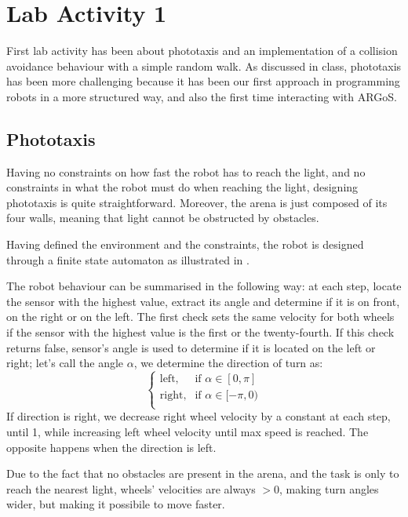 \section{Lab Activity 1}\label{sec:lab01}

First lab activity has been about phototaxis and an implementation of a
collision avoidance behaviour with a simple random walk.
As discussed in class, phototaxis has been more challenging because
it has been our first approach in programming robots in a more structured
way, and also the first time interacting with ARGoS.

\subsection{Phototaxis}\label{ssec:phototaxis}

Having no constraints on how fast the robot has to reach the light, and
no constraints in what the robot must do when reaching the light, designing
phototaxis is quite straightforward. Moreover, the arena is just composed
of its four walls, meaning that light cannot be obstructed by obstacles.

Having defined the environment and the constraints, the robot is designed through
a finite state automaton as illustrated in .

The robot behaviour can be summarised in the following way: at each step,
locate the sensor with the highest value, extract its angle and determine if it
is on front, on the right or on the left. The first check sets the same
velocity for both wheels if the sensor with the highest value is the first or
the twenty-fourth. If this check returns false, sensor's angle is used to
determine if it is located on the left or right; let's call the angle $\alpha$,
we determine the direction of turn as:
%
\begin{equation}
    \begin{cases}
        \text{left}, & \text{if } \alpha \in [0, \pi] \\
        \text{right}, & \text{if } \alpha \in [-\pi, 0) \\
    \end{cases}
\end{equation}
%
If direction is right, we decrease right wheel velocity by a constant at each
step, until 1, while increasing left wheel velocity until max speed is reached.
The opposite happens when the direction is left.

Due to the fact that no obstacles are present in the arena, and the task is
only to reach the nearest light, wheels' velocities are always $> 0$, making
turn angles wider, but making it possibile to move faster.

